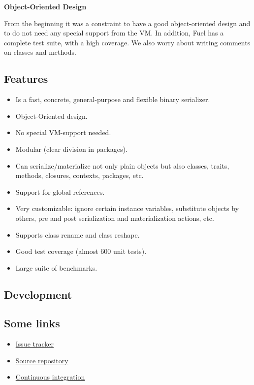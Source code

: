 \documentclass[a4paper,10pt,twoside]{book}
\begin{document}
\begin{list}{}{}
\item\hspace{-\labelwidth}\textbf{ Object-Oriented Design}
\item  From the beginning it was a constraint to have a good object-oriented design and to do not need any special support from the VM. In addition, Fuel has a complete test suite, with a high coverage. We also worry about writing comments on classes and methods. 
\end{list}

\subsection{Features}

\begin{itemize}
\item  Is a fast, concrete, general-purpose and flexible binary serializer.
\item  Object-Oriented design.
\item  No special VM-support needed.
\item  Modular (clear division in packages).
\item  Can serialize$/$materialize not only plain objects but also classes, traits, methods, closures, contexts, packages, etc.
\item  Support for global references.
\item  Very customizable: ignore certain instance variables, substitute objects by others, pre and post serialization and materialization actions, etc.
\item  Supports class rename and class reshape.
\item  Good test coverage (almost 600 unit tests).
\item  Large suite of benchmarks.
\end{itemize}

\subsection{Development}

\subsection{Some links}

\begin{itemize}
\item  \href{http://code.google.com/p/fuel/issues/list}{Issue tracker}
\item  \href{http://ss3.gemstone.com/ss/Fuel.html}{Source repository}
\item  \href{http://ci.inria.fr/pharo-contribution/job/Fuel/}{Continuous integration}
\end{itemize}
\end{document}
